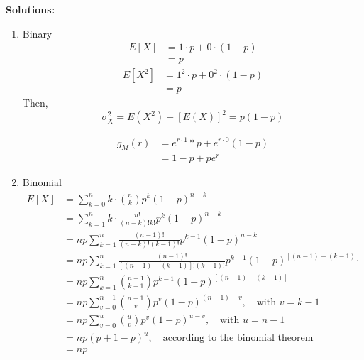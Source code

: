 \documentclass[UTF8]{article}
\begin{document}
    \textbf{Solutions:}
    \begin{enumerate}
        \item Binary
            \begin{equation*}
                \begin{split}
                    E[X] &= 1\cdot p+0\cdot(1-p)\\
                    &=p                    
                \end{split}            
            \end{equation*}
            \begin{equation*}
                \begin{split}
                    E[X^2] &= 1^2\cdot p+0^2\cdot(1-p)\\
                    &= p
                \end{split}
            \end{equation*}
        Then, 
            \begin{equation*}
                \sigma^2_X=E(X^2)-[E(X)]^2=p(1-p)
            \end{equation*}
            
            \begin{equation*}
                \begin{split}
                    g_M(r) &= e^{r\cdot1}*p+e^{r\cdot0}(1-p)\\
                    &=1-p+pe^r
                \end{split}
            \end{equation*}
        \item Binomial
            \begin{equation*}
                \begin{split}
                    E[X] &=\sum^n_{k=0}k\cdot\binom{n}{k}p^k(1-p)^{n-k}\\
                    &=\sum^n_{k=1}k\cdot\frac{n!}{(n-k)!k!}p^k(1-p)^{n-k}\\
                    &=np\sum^n_{k=1}\frac{(n-1)!}{(n-k)!(k-1)!}p^{k-1}(1-p)^{n-k}\\
                    &=np\sum^{n}_{k=1}\frac{(n-1)!}{[(n-1)-(k-1)]!(k-1)!}p^{k-1}(1-p)^{[(n-1)-(k-1)]}\\
                    &=np\sum^{n}_{k=1}\binom{n-1}{k-1}p^{k-1}(1-p)^{[(n-1)-(k-1)]}\\
                    &=np\sum^{n-1}_{v=0}\binom{n-1}{v}p^v(1-p)^{(n-1)-v},\quad\text{with $v=k-1$}\\
                    &=np\sum^{u}_{v=0}\binom{u}{v}p^v(1-p)^{u-v},\quad\text{with $u=n-1$}\\
                    &=np(p+1-p)^u,\quad\text{according to the binomial theorem }\\
                    &=np
                \end{split}
            \end{equation*}


\end{enumerate}
\end{document}
